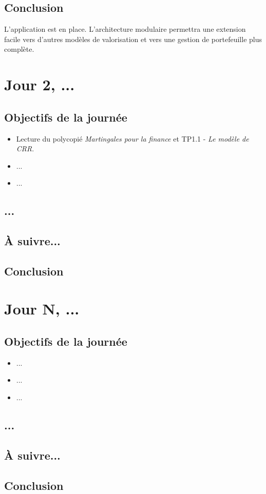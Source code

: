 \documentclass[a4paper,11pt]{article}
\begin{document}
\subsection{Conclusion}
L’application est en place. L’architecture modulaire permettra une extension facile vers d'autres modèles de valorisation et vers une gestion de portefeuille plus complète.

\newpage


\section{Jour 2, ...}

\subsection{Objectifs de la journée}
\begin{itemize}
    \item Lecture du polycopié \textit{Martingales pour la finance} et TP1.1 - \textit{Le modèle de CRR}.
    \item ...
    \item ...
\end{itemize}
\subsection{...}
\subsection{À suivre...}
\subsection{Conclusion}

\newpage


\section{Jour N, ...}
\subsection{Objectifs de la journée}
\begin{itemize}
    \item ...
    \item ...
    \item ...
\end{itemize}
\subsection{...}
\subsection{À suivre...}
\subsection{Conclusion}
\newpage
\end{document}
